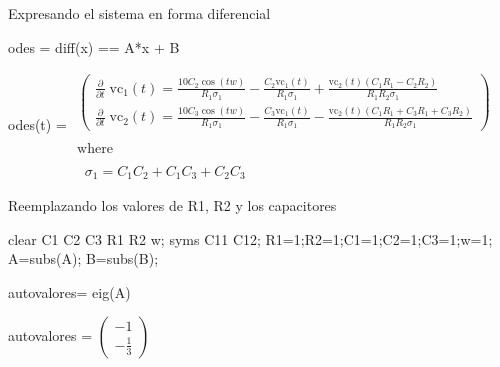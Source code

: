 \documentclass[10pt,a4paper]{article} %
\begin{document}
\begin{par}
	\begin{flushleft}
		Expresando el sistema en forma diferencial
	\end{flushleft}
\end{par}

\begin{matlabcode}
	odes = diff(x) ==  A*x + B
\end{matlabcode}
\begin{matlabsymbolicoutput}
	odes(t) = 
	$\displaystyle \begin{array}{l}
	\left(\begin{array}{c}
	\frac{\partial }{\partial t}\;{\textrm{vc}}_1 \left(t\right)=\frac{10 C_2  \cos \left(t w\right)}{R_1  \sigma_1 }-\frac{C_2  {\textrm{vc}}_1 \left(t\right)}{R_1  \sigma_1 }+\frac{{\textrm{vc}}_2 \left(t\right) {\left(C_1  R_1 -C_2  R_2 \right)}}{R_1  R_2  \sigma_1 }\\
	\frac{\partial }{\partial t}\;{\textrm{vc}}_2 \left(t\right)=\frac{10 C_3  \cos \left(t w\right)}{R_1  \sigma_1 }-\frac{C_3  {\textrm{vc}}_1 \left(t\right)}{R_1  \sigma_1 }-\frac{{\textrm{vc}}_2 \left(t\right) {\left(C_1  R_1 +C_3  R_1 +C_3  R_2 \right)}}{R_1  R_2  \sigma_1 }
	\end{array}\right)\\
	\mathrm{}\\
	\textrm{where}\\
	\mathrm{}\\
	\;\;\sigma_1 =C_1  C_2 +C_1  C_3 +C_2  C_3 
	\end{array}$
\end{matlabsymbolicoutput}

\begin{par}
	\begin{flushleft}
		Reemplazando los valores de R1, R2 y los capacitores
	\end{flushleft}
\end{par}

\begin{matlabcode}
	clear C1 C2 C3 R1 R2 w;
	syms C11 C12;
	R1=1;R2=1;C1=1;C2=1;C3=1;w=1;
	A=subs(A);
	B=subs(B);
\end{matlabcode}


\begin{matlabcode}
	autovalores= eig(A)
\end{matlabcode}
\begin{matlabsymbolicoutput}
	autovalores = 
	$\displaystyle \left(\begin{array}{c}
	-1\\
	-\frac{1}{3}
	\end{array}\right)$
\end{matlabsymbolicoutput}
\end{document}
